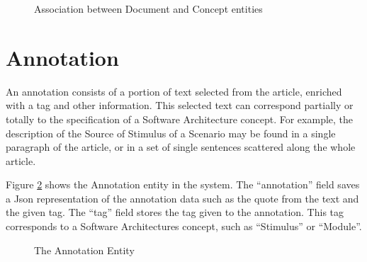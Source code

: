 \begin{figure}[h]
\centering
\renewcommand {\umltextcolor}{black}
\renewcommand {\umlfillcolor}{none}
\renewcommand {\umldrawcolor}{black}

\caption{Association between Document and Concept entities}
\label{figure:documentConcept}
\end{figure}

\section{Annotation}
\label{section:annotation}

An annotation consists of a portion of text selected from the article, enriched with a tag and other information. This selected text can correspond partially or totally to the specification of a Software Architecture concept. For example, the description of the Source of Stimulus of a Scenario may be found in a single paragraph of the article, or in a set of single sentences scattered along the whole article. 

Figure \ref{figure:annotationEntity} shows the Annotation entity in the system. The ``annotation'' field saves a Json representation of the annotation data such as the quote from the text and the given tag. The ``tag'' field stores the tag given to the annotation. This tag corresponds to a Software Architectures concept, such as ``Stimulus'' or ``Module''.

\begin{figure}[h]
\centering
\renewcommand {\umltextcolor}{black}
\renewcommand {\umlfillcolor}{none}
\renewcommand {\umldrawcolor}{black}

\caption{The Annotation Entity}
\label{figure:annotationEntity}
\end{figure}

